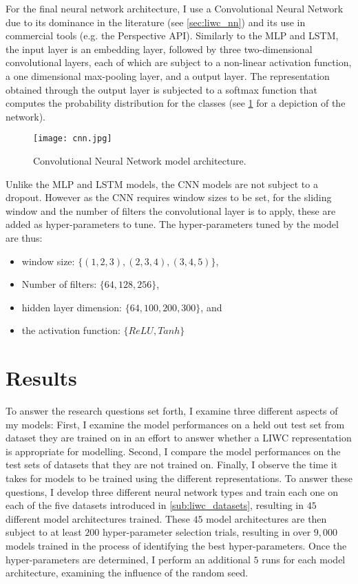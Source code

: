 For the final neural network architecture, I use a Convolutional Neural Network due to its dominance in the literature (see \cref{sec:liwc_nn}) and its use in commercial tools (e.g. the Perspective API). Similarly to the MLP and LSTM, the input layer is an embedding layer, followed by three two-dimensional convolutional layers, each of which are subject to a non-linear activation function, a one dimensional max-pooling layer, and a output layer. The representation obtained through the output layer is subjected to a softmax function that computes the probability distribution for the classes (see \cref{fig:liwc_cnn} for a depiction of the network).

\begin{figure}
  \centering
  \texttt{[image: cnn.jpg]}
  \caption{Convolutional Neural Network model architecture.}
  \label{fig:liwc_cnn}
\end{figure}

Unlike the MLP and LSTM models, the CNN models are not subject to a dropout. However as the CNN requires window sizes to be set, for the sliding window and the number of filters the convolutional layer is to apply, these are added as hyper-parameters to tune. The hyper-parameters tuned by the model are thus:

\begin{itemize}
  \item window size: $\{(1, 2, 3), (2, 3, 4), (3, 4, 5)\}$,
  \item Number of filters: $\{64, 128, 256\}$,
  \item hidden layer dimension: $\{64, 100, 200, 300\}$, and
  \item the activation function: $\{ReLU, Tanh\}$
\end{itemize}

\section{Results}

To answer the research questions set forth, I examine three different aspects of my models: First, I examine the model performances on a held out test set from dataset they are trained on in an effort to answer whether a LIWC representation is appropriate for modelling.
Second, I compare the model performances on the test sets of datasets that they are not trained on. Finally, I observe the time it takes for models to be trained using the different representations.
To answer these questions, I develop three different neural network types and train each one on each of the five datasets introduced in \cref{sub:liwc_datasets}, resulting in $45$ different model architectures trained. These $45$ model architectures are then subject to at least $200$ hyper-parameter selection trials, resulting in over $9,000$ models trained in the process of identifying the best hyper-parameters. Once the hyper-parameters are determined, I perform an additional $5$ runs for each model architecture, examining the influence of the random seed.

